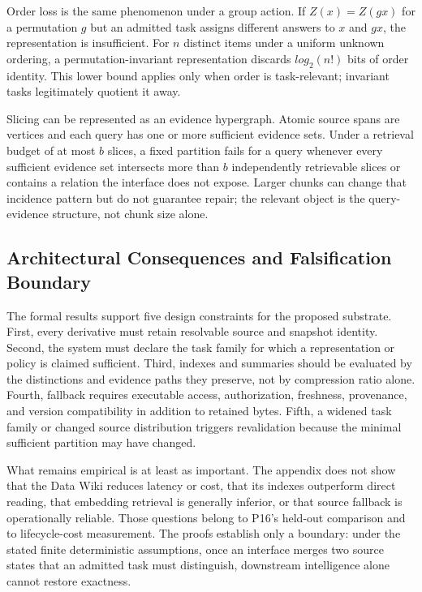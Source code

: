 Order loss is the same phenomenon under a group action. If $Z(x)=Z(gx)$ for a permutation $g$ but an admitted task assigns different answers to $x$ and $gx$, the representation is insufficient. For $n$ distinct items under a uniform unknown ordering, a permutation-invariant representation discards $log_2(n!)$ bits of order identity. This lower bound applies only when order is task-relevant; invariant tasks legitimately quotient it away.

Slicing can be represented as an evidence hypergraph. Atomic source spans are vertices and each query has one or more sufficient evidence sets. Under a retrieval budget of at most $b$ slices, a fixed partition fails for a query whenever every sufficient evidence set intersects more than $b$ independently retrievable slices or contains a relation the interface does not expose. Larger chunks can change that incidence pattern but do not guarantee repair; the relevant object is the query-evidence structure, not chunk size alone.

\subsection{Architectural Consequences and Falsification Boundary}

The formal results support five design constraints for the proposed substrate. First, every derivative must retain resolvable source and snapshot identity. Second, the system must declare the task family for which a representation or policy is claimed sufficient. Third, indexes and summaries should be evaluated by the distinctions and evidence paths they preserve, not by compression ratio alone. Fourth, fallback requires executable access, authorization, freshness, provenance, and version compatibility in addition to retained bytes. Fifth, a widened task family or changed source distribution triggers revalidation because the minimal sufficient partition may have changed.

What remains empirical is at least as important. The appendix does not show that the Data Wiki reduces latency or cost, that its indexes outperform direct reading, that embedding retrieval is generally inferior, or that source fallback is operationally reliable. Those questions belong to P16's held-out comparison and to lifecycle-cost measurement. The proofs establish only a boundary: under the stated finite deterministic assumptions, once an interface merges two source states that an admitted task must distinguish, downstream intelligence alone cannot restore exactness.





